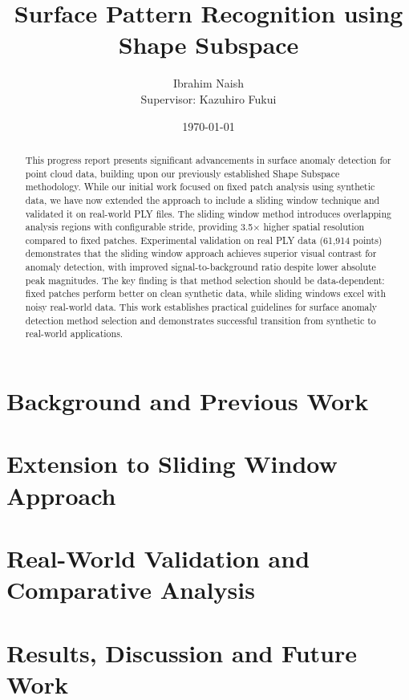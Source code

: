 \documentclass{article}
\title{Surface Pattern Recognition using Shape Subspace}
\author{Ibrahim Naish\\Supervisor: Kazuhiro Fukui}
\date{\today}
\begin{document}
\maketitle

\begin{abstract}

This progress report presents significant advancements in surface anomaly detection for point cloud data, building upon our previously established Shape Subspace methodology. While our initial work focused on fixed patch analysis using synthetic data, we have now extended the approach to include a sliding window technique and validated it on real-world PLY files. The sliding window method introduces overlapping analysis regions with configurable stride, providing 3.5× higher spatial resolution compared to fixed patches. Experimental validation on real PLY data (61,914 points) demonstrates that the sliding window approach achieves superior visual contrast for anomaly detection, with improved signal-to-background ratio despite lower absolute peak magnitudes. The key finding is that method selection should be data-dependent: fixed patches perform better on clean synthetic data, while sliding windows excel with noisy real-world data. This work establishes practical guidelines for surface anomaly detection method selection and demonstrates successful transition from synthetic to real-world applications.


\end{abstract}

\section{Background and Previous Work}


\section{Extension to Sliding Window Approach}


\section{Real-World Validation and Comparative Analysis}


\section{Results, Discussion and Future Work}


\printbibliography[]
\end{document}
